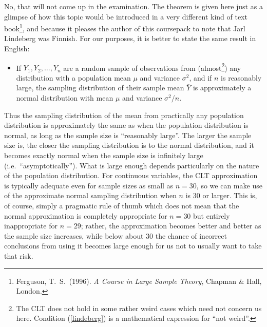 No, that will not come up in the examination. The theorem is given here
just as a glimpse of how this topic would be introduced in
a very different kind of text book\footnote{Ferguson, T.\ S.\ (1996). \emph{A Course in Large Sample
Theory}, Chapman \& Hall, London.}, and because it pleases the author of this
coursepack to note that Jarl Lindeberg was Finnish. For our purposes, it is
better to state the same result in English:
\begin{itemize}
\item
If $Y_{1}, Y_{2}, \dots, Y_{n}$ are a random sample of observations from
(almost\footnote{The CLT does not hold in some rather weird cases which
need not concern us here. Condition (\ref{lindeberg}) is a mathematical
expression for ``not weird''.}) any distribution with a population mean
$\mu$ and variance $\sigma^{2}$, and if $n$ is reasonably large, the
sampling distribution of their sample mean $\bar{Y}$ is approximately a
normal distribution with mean $\mu$ and variance $\sigma^{2}/n$.
\end{itemize}
Thus the sampling distribution of the mean from practically any
population distribution is approximately the same as when the population
distribution is normal, as long as the sample size is ``reasonably
large''. The larger the sample size is, the closer the sampling
distribution is to the normal distribution, and it becomes exactly
normal when the sample size is infinitely large (i.e.\
``asymptotically''). What is large enough depends particularly on the
nature of the population distribution. For continuous variables, the CLT
approximation is typically adequate even for sample sizes as small as
$n=30$, so we can make use of the approximate normal sampling
distribution when $n$ is 30 or larger. This is, of course, simply a
pragmatic rule of thumb which does not mean that the normal
approximation is completely appropriate for $n=30$ but entirely
inappropriate for $n=29$; rather, the approximation becomes better and
better as the sample size increases, while below about 30 the chance of
incorrect conclusions from using it becomes large enough for us not to
usually want to take that risk.

